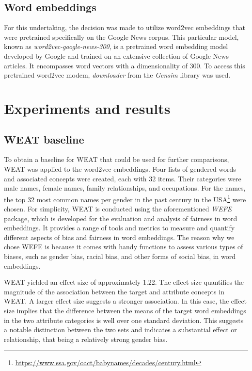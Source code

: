 \documentclass[11pt]{article}
\begin{document}
\subsection{Word embeddings}
For this undertaking, the decision was made to utilize word2vec embeddings that were pretrained specifically on the Google News corpus. This particular model, known as \textit{word2vec-google-news-300}, is a pretrained word embedding model developed by Google and trained on an extensive collection of Google News articles. It encompasses word vectors with a dimensionality of 300. To access this pretrained word2vec modem, \textit{downloader} from the \textit{Gensim} library was used.

\section{Experiments and results}
\subsection{WEAT baseline}
To obtain a baseline for WEAT that could be used for further comparisons, WEAT was applied to the word2vec embeddings. Four lists of gendered words and associated concepts were created, each with 32 items. Their categories were male names, female names, family relationships, and occupations. For the names, the top 32 most common names per gender in the past century in the USA\footnote{\url{https://www.ssa.gov/oact/babynames/decades/century.html}} were chosen. For simplicity, WEAT is conducted using the aforementioned \textit{WEFE} package, which is developed for the evaluation and analysis of fairness in word embeddings. It provides a range of tools and metrics to measure and quantify different aspects of bias and fairness in word embeddings. The reason why we chose WEFE is because it comes with handy functions to assess various types of biases, such as gender bias, racial bias, and other forms of social bias, in word embeddings.

WEAT yielded an effect size of approximately 1.22. The effect size quantifies the magnitude of the association between the target and attribute concepts in WEAT. A larger effect size suggests a stronger association. In this case, the effect size implies that the difference between the means of the target word embeddings in the two attribute categories is well over one standard deviation. This suggests a notable distinction between the two sets and indicates a substantial effect or relationship, that being a relatively strong gender bias.
\end{document}
